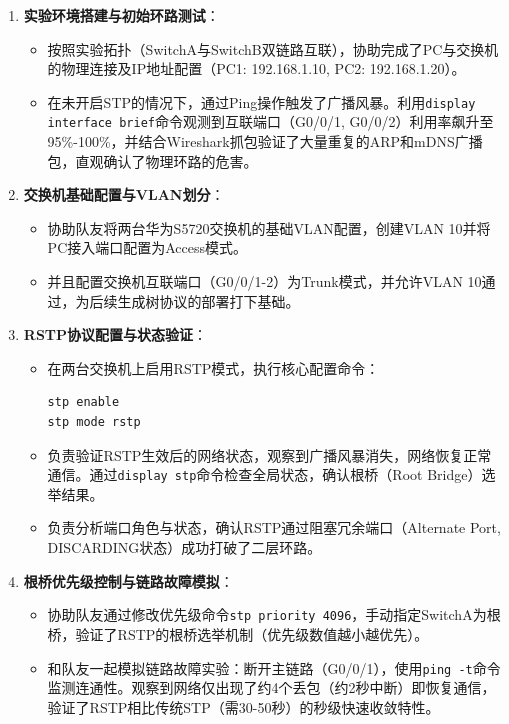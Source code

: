 \documentclass[a4paper]{article}
\begin{document}
\begin{enumerate}
    \item \textbf{实验环境搭建与初始环路测试}：
    \begin{itemize}
        \item 按照实验拓扑（SwitchA与SwitchB双链路互联），协助完成了PC与交换机的物理连接及IP地址配置（PC1: 192.168.1.10, PC2: 192.168.1.20）。
        \item 在未开启STP的情况下，通过Ping操作触发了广播风暴。利用\texttt{display interface brief}命令观测到互联端口（G0/0/1, G0/0/2）利用率飙升至95\%-100\%，并结合Wireshark抓包验证了大量重复的ARP和mDNS广播包，直观确认了物理环路的危害。
    \end{itemize}

    \item \textbf{交换机基础配置与VLAN划分}：
    \begin{itemize}
        \item 协助队友将两台华为S5720交换机的基础VLAN配置，创建VLAN 10并将PC接入端口配置为Access模式。
        \item 并且配置交换机互联端口（G0/0/1-2）为Trunk模式，并允许VLAN 10通过，为后续生成树协议的部署打下基础。
    \end{itemize}

    \item \textbf{RSTP协议配置与状态验证}：
    \begin{itemize}
        \item 在两台交换机上启用RSTP模式，执行核心配置命令：
\begin{lstlisting}
stp enable
stp mode rstp
\end{lstlisting}
        \item 负责验证RSTP生效后的网络状态，观察到广播风暴消失，网络恢复正常通信。通过\texttt{display stp}命令检查全局状态，确认根桥（Root Bridge）选举结果。
        \item 负责分析端口角色与状态，确认RSTP通过阻塞冗余端口（Alternate Port, DISCARDING状态）成功打破了二层环路。
    \end{itemize}

    \item \textbf{根桥优先级控制与链路故障模拟}：
    \begin{itemize}
        \item 协助队友通过修改优先级命令\texttt{stp priority 4096}，手动指定SwitchA为根桥，验证了RSTP的根桥选举机制（优先级数值越小越优先）。
        \item 和队友一起模拟链路故障实验：断开主链路（G0/0/1），使用\texttt{ping -t}命令监测连通性。观察到网络仅出现了约4个丢包（约2秒中断）即恢复通信，验证了RSTP相比传统STP（需30-50秒）的秒级快速收敛特性。
    \end{itemize}


\end{enumerate}
\end{document}
